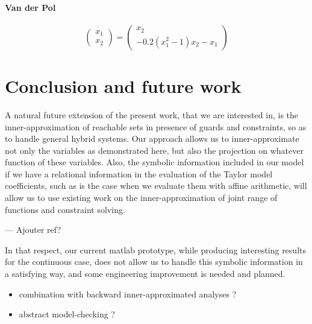 \documentclass{sig-alternate-05-2015} %
\newcommand\ForAuthors[1]%
 {\par\smallskip                     %
  \begin{center}%
   \fbox%
   {\parbox{0.9\linewidth}%
    {\raggedright\sc--- #1}%
   }%
  \end{center}%
  \par\smallskip                     %
 }
\begin{document}
\paragraph{Van der Pol}

\begin{equation}
\dot{\left(\begin{array}{c}
x_1 \\
x_2
\end{array}\right)} = \left(\begin{array}{c}
x_2 \\
-0.2(x^2_1-1)x_2-x_1
\end{array}\right)
\end{equation}


\section{Conclusion and future work}
%
A natural future extension of the present work, that we are interested in, is the inner-approximation of reachable sets 
in presence of guards and constraints, so as to handle general hybrid systems. Our approach allows us to inner-approximate 
not only the variables as demonstrated here, but also the projection on whatever function of these variables. Also, the 
symbolic information included in our model if we have a relational information in the evaluation of the Taylor model coefficients, 
such as is the case when we evaluate them with affine arithmetic, will allow us to use existing work on the inner-approximation 
of joint range of functions and constraint solving. 
\ForAuthors{Ajouter ref?} 
In that respect, our current matlab prototype, while producing interesting results for the continuous case, does not allow us to 
handle this symbolic information in a satisfying way, and some engineering improvement is needed and planned.


\begin{itemize}
\item combination with backward inner-approximated analyses ? 
\item abstract model-checking ? 
\end{itemize}



\end{document}
